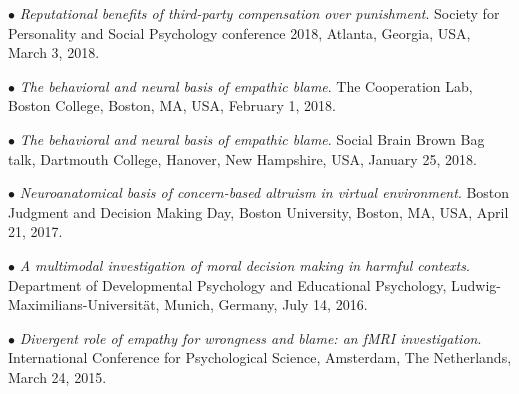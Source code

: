 \documentclass[10pt]{article}
\begin{document}
	$\bullet$ \textit{Reputational benefits of third-party compensation over punishment}. Society for Personality and Social \hspace*{0.1in}Psychology conference 2018, Atlanta, Georgia, USA, March 3, 2018.\\
	\miniskip
	
	$\bullet$ \textit{The behavioral and neural basis of empathic blame}. The Cooperation Lab, Boston College, Boston, MA, USA, \hspace*{0.1in}February 1, 2018.\\
	\miniskip	
	
	$\bullet$ \textit{The behavioral and neural basis of empathic blame}. Social Brain Brown Bag talk, Dartmouth College, \hspace*{0.1in}Hanover, New Hampshire, USA, January 25, 2018.\\
	\miniskip
	
	$\bullet$ \textit{Neuroanatomical basis of concern-based altruism in virtual environment}. Boston Judgment and Decision \hspace*{0.1in}Making Day, Boston University, Boston, MA, USA, April 21, 2017.\\
	\miniskip
	
%	

	$\bullet$ \textit{A multimodal investigation of moral decision making in harmful contexts}. Department of Developmental \hspace*{0.1in}Psychology and Educational Psychology, Ludwig-Maximilians-Universit{\"a}t, Munich, Germany, July 14, 2016.\\
	\miniskip
		
	$\bullet$ \textit{Divergent role of empathy for wrongness and blame: an fMRI investigation}. International Conference for \hspace*{0.1in}Psychological Science, Amsterdam, The Netherlands, March 24, 2015.\\
	\miniskip
	
\end{document}
